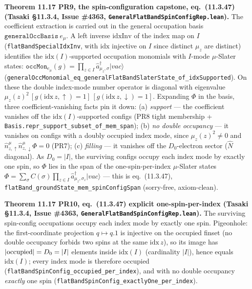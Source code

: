 \documentclass[a4paper,11pt]{article}
\begin{document}
\medskip\noindent\textbf{Theorem 11.17 PR9, the spin-configuration capstone, eq.~(11.3.47) (Tasaki
§11.3.4, Issue \#4363, \texttt{GeneralFlatBandSpinConfigRep.lean}).}  The coefficient extraction is
carried out in the general occupation basis $\texttt{generalOccBasis}\ e_\mu$.  A left inverse
$\mathrm{idxInv}$ of the index map on $I$ (\texttt{flatBandSpecialIdxInv}, with $\mathrm{idx}$
injective on $I$ since distinct $\mu_z$ are distinct) identifies the $\mathrm{idx}(I)$-supported
occupation monomials with $I$-mode $\mu$-Slater states:
$\texttt{occMon}_{e_\mu}(g)=\prod_{z\in I}\hat a^\dagger_{\mu_z,\sigma}|vac\rangle$
(\texttt{generalOccMonomial\_eq\_generalFlatBandSlaterState\_of\_idxSupported}).  On these the double
index-mode number operator is diagonal with eigenvalue
$\mu_z(z)^2\,[g(\mathrm{idx}\,z,\uparrow){=}1]\,[g(\mathrm{idx}\,z,\downarrow){=}1]$.  Expanding
$\Phi$ in the basis, three coefficient-vanishing facts pin it down: (a) \emph{support} --- the
coefficient vanishes off the $\mathrm{idx}(I)$-supported configs (PR8 tight membership +
\texttt{Basis.repr\_support\_subset\_of\_mem\_span}); (b) \emph{no double occupancy} --- it vanishes
on configs with a doubly occupied index mode, since $\mu_z(z)^2\ne0$ and $\hat n^\mu_{z,\uparrow}\hat
n^\mu_{z,\downarrow}\Phi=0$ (PR7); (c) \emph{filling} --- it vanishes off the $D_0$-electron sector
($\hat N$ diagonal).  As $D_0=|I|$, the surviving configs occupy each index mode by exactly one spin,
so $\Phi$ lies in the span of the one-spin-per-index $\mu$-Slater states
$\Phi=\sum_\sigma C(\sigma)\prod_{z\in I}\hat a^\dagger_{\mu_z,\sigma_z}|vac\rangle$ --- this is
eq.~(11.3.47), \texttt{flatBand\_groundState\_mem\_spinConfigSpan} (sorry-free, axiom-clean).

\medskip\noindent\textbf{Theorem 11.17 PR10, eq.~(11.3.47) explicit one-spin-per-index (Tasaki
§11.3.4, Issue \#4363, \texttt{GeneralFlatBandSpinConfigRep.lean}).}  The surviving spin-config
occupations occupy each index mode by exactly one spin.  Pigeonhole: the first-coordinate projection
$q\mapsto q.1$ is injective on the occupied finset (no double occupancy forbids two spins at the same
$\mathrm{idx}\,z$), so its image has $|{\rm occupied}|=D_0=|I|$ elements inside $\mathrm{idx}(I)$
(cardinality $|I|$), hence equals $\mathrm{idx}(I)$; every index mode is therefore occupied
(\texttt{flatBandSpinConfig\_occupied\_per\_index}), and with no double occupancy \emph{exactly} one
spin (\texttt{flatBandSpinConfig\_exactlyOne\_per\_index}).
\end{document}
